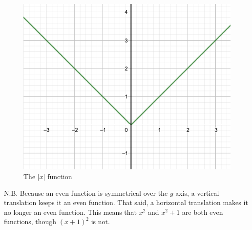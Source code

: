 \documentclass{beamer}
\begin{document}
    \begin{frame}
        \begin{example}
            \begin{figure}
                \caption{The $\left\lvert x \right\rvert$ function}
                \includegraphics[scale=0.3]{images/absx.png}
            \end{figure}
        \end{example}
    \end{frame}
    \begin{frame}
        \begin{alertblock}{N.B.}
            Because an even function is symmetrical over the $y$ axis, a vertical translation keeps it an even function. That said, a horizontal translation makes it no longer an even function. This means that $x^2$ and $x^2+1$ are both even functions, though $(x+1)^2$ is not.
        \end{alertblock}
    \end{frame}
\end{document}
